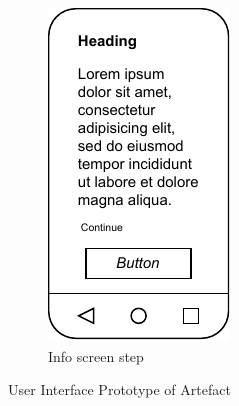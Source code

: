\begin{figure}[htbp]
\begin{subfigure}[b]{0.3\textwidth}
        \includegraphics[width=\textwidth]{content/05_design_and_dev_artefacts/ActivityInfoScreen.drawio.pdf}
        \caption{Info screen step}
        \label{subfig:InfoScreen}
    \end{subfigure}
       \caption{User Interface Prototype of Artefact}
       \label{fig:uiPrototypeArtefact}
\end{figure}

